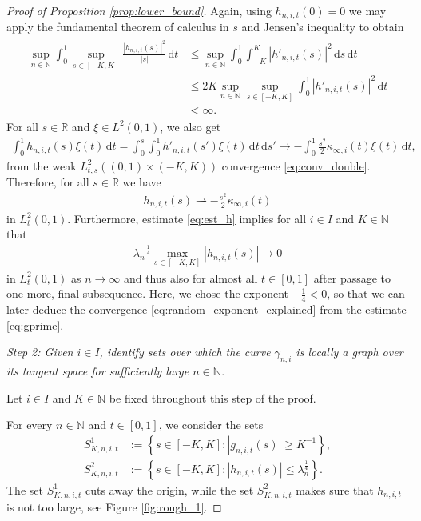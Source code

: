 \documentclass[11pt]{article}
\numberwithin{statement}{section}
\numberwithin{equation}{section}
\theoremstyle{remark}
\newcommand{\R}{\mathbb R} 				%
\newcommand{\N}{\mathbb N}
\newcommand{\intd}{\, \mathrm{d}} 				%
\newcommand{\warr}{\rightharpoonup}				%
\begin{document}
\begin{proof}[Proof of Proposition \ref{prop:lower_bound}]
	Again, using $h_{n,i,t}(0) = 0$ we may apply the
        fundamental theorem of calculus in $s$ and Jensen's inequality
        to obtain 
	\begin{align}\label{eq:est_h}
	\begin{split}
          \sup_{n\in \N} \int_{0}^{1} \sup_{s \in [-K,K]}
          \frac{|h_{n,i,t}(s)|^2}{|s|} \intd t & \leq \sup_{n\in \N}
          \int_{0}^{1} \int_{-K}^{K}
          |h'_{n,i,t}(s)|^2 \intd s  \intd t \\
          & \leq 2 K \sup_{n\in \N}\sup_{s\in [-K,K]}
          \int_{0}^{1}  |h'_{n,i,t}(s)|^2 \intd t \\
          & < \infty.
         \end{split}
	\end{align}
	For all $s \in \R$ and $\xi \in L^2(0,1)$, we also get  
	\begin{align}
          \int_0^1 h_{n,i,t}(s)\xi(t) \intd t = \int_0^s
          \int_0^1 h'_{n,i,t}(s')\xi(t) \intd t \intd s' \to -
          \int_0^1  \frac{s^2}{2} 
          \kappa_{\infty,i}(t) \xi(t) \intd t, 
	\end{align}
	from the weak $L_{t,s}^2((0,1)\times (-K,K) )$
        convergence \eqref{eq:conv_double}.  Therefore,
        for all $s \in \R$ we have
	\begin{align}\label{eq:h_weak}
		 h_{n,i,t}(s)\warr - \frac{s^2}{2}
          \kappa_{\infty,i}(t) 
	\end{align}
	in $L_t^2(0,1)$.  Furthermore, estimate \eqref{eq:est_h}
        implies for all $i \in I$ and $K \in \N$ that
	\begin{align}\label{eq:normal_parts_bound}
          \lambda_n^{-\frac{1}{4}} \max_{s\in [-K,K]} |h_{n,i,t}(s)| \to 0
	\end{align}
	in $L_t^2 (0,1)$ as $n \to \infty$ and thus also for almost
        all $t\in [0,1]$ after passage to one more, final
        subsequence. Here, we chose the exponent $ - \frac{1}{4} < 0$,
        so that we can later deduce the convergence
        \eqref{eq:random_exponent_explained} from the estimate
        \eqref{eq:gprime}.
	

        \textit{Step 2: Given $i\in I$, identify sets over which the
          curve $\gamma_{n,i}$ is locally a graph over its
          tangent space for sufficiently large $n \in \N$.}

	Let $i \in I$ and $K \in \N$ be fixed throughout this step of
        the proof.
	
        For every $n \in \N$ and $t\in [0,1]$, we consider the
        sets
	\begin{align}\label{eq:defS1}
          S^1_{K,n,i,t}& := \left\{ s \in [-K,K]: |g_{n,i,t}(s)| \geq  K^{-1}\right\},\\
          S^2_{K,n,i,t} & := \left\{ s  \in  [-K,K]:
                          |h_{n,i,t}(s)| \leq
                          \lambda_n^{\frac{1}{4}}\right\}. \label{eq:defS2} 
	\end{align}
	The set $S^1_{K,n,i,t}$ cuts away the origin, while the set
        $S^2_{K,n,i,t}$ makes sure that $h_{n,i,t}$ is not too large,
        see Figure \ref{fig:rough_1}.
        

\end{proof}
\end{document}

